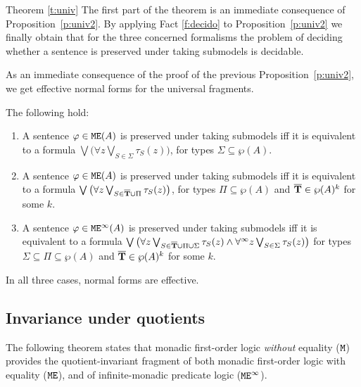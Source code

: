 \begin{proofof}{Theorem \ref{t:univ}}
The  first part of  the theorem is an immediate consequence of 
Proposition~\ref{p:univ2}. By applying Fact \ref{f:decido} to 
Proposition~\ref{p:univ2} we finally obtain that for the three concerned 
formalisms the problem of deciding whether a sentence is preserved under taking 
submodels is decidable.
\end{proofof}

As an immediate consequence of the proof of the previous 
Proposition~\ref{p:univ2}, we get effective normal forms for the universal
fragments.

\begin{corollary}\label{cor:univ}
The following hold:
\begin{enumerate}
\item\label{cor:ofo} 
A sentence $\varphi \in \mathtt{M}\mathtt{E}(A)$ is preserved under taking submodels iff it is 
equivalent to a formula 
$\bigvee \big( \forall z \bigvee_{S \in \Sigma} \tau_{S}(z)\big)$, for  types 
$\Sigma\subseteq \wp(A)$.
\item\label{cor:ofoe} 
A sentence $\varphi \in \mathtt{M}\mathtt{E}(A)$ is preserved under taking submodels iff it is 
equivalent to a formula 
$\bigvee \big( \forall z \bigvee_{S \in \overline{{\mathbf{T}}}\cup \Pi} \tau_{S}(z)\big)$, 
for types $\Pi \subseteq \wp(A)$ and $\overline{{\mathbf{T}}} \in \wp(A)^k$ for some $k$.
\item\label{cor:ofoei} 
A sentence $\varphi \in \mathtt{M}\mathtt{E}^{\infty}(A)$ is preserved under taking submodels iff it is 
equivalent to a formula 
$\bigvee \big(\forall z \bigvee_{S \in \overline{{\mathbf{T}}}\cup \Pi\cup\Sigma} \tau_{S}(z) 
   \land \forall^\infty z \bigvee_{S \in \Sigma} \tau_{S}(z)\big)$ 
for types $\Sigma\subseteq \Pi \subseteq \wp(A)$ and $\overline{{\mathbf{T}}} \in \wp(A)^k$
for some $k$.
\end{enumerate}
In all three cases, normal forms are effective.
\end{corollary}


\subsection{Invariance under quotients}

The following theorem states that monadic first-order logic \emph{without}
equality ($\mathtt{M}$) provides the quotient-invariant fragment of both monadic 
first-order logic with equality ($\mathtt{M}\mathtt{E}$), and of infinite-monadic predicate 
logic ($\mathtt{M}\mathtt{E}^{\infty}$).

